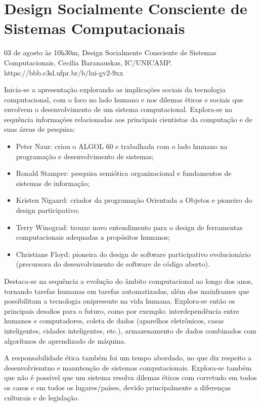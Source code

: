 \section{Design Socialmente Consciente de Sistemas Computacionais}

\begin{center}
  \vspace{1cm}
  03 de agosto às 10h30m, Design Socialmente Consciente de Sistemas Computacionais, Cecilia Baranauskas, IC/UNICAMP. https://bbb.c3sl.ufpr.br/b/lui-gv2-9xx
  \vspace{1cm}
\end{center}

Inicia-se a apresentação explorando as implicações sociais da tecnologia computacional, com o foco no lado humano e nos dilemas éticos e sociais que envolvem o desenvolvimento de um sistema computacional. Explora-se na sequência informações relacionadas aos principais cientistas da computação e de suas áreas de pesquisa:

\begin{itemize}
  \item Peter Naur: criou o ALGOL 60 e trabalhada com o lado humano na programação e desenvolvimento de sistemas;
  \item Ronald Stamper: pesquisa semiótica organizacional e fundamentos de sistemas de informação;
  \item Kristen Nigaard: criador da programação Orientada a Objetos e pioneiro do design participativo;
  \item Terry Winograd: trouxe novo entendimento para o design de ferramentas computacionais adequadas a propósitos humanos;
  \item Christiane Floyd: pioneira do design de software participativo evolucionário (precursora do desenvolvimento de software de código aberto).
\end{itemize}

Destaca-se na sequência a evolução do âmbito computacional ao longo dos anos, tornando tarefas humanas em tarefas automatizadas, além dos mainframes que possibilitam a tecnologia onipresente na vida humana. Explora-se então os principais desafios para o futuro, como por exemplo: interdependência entre humanos e computadores, coleta de dados (aparelhos eletrônicos, casas inteligentes, cidades inteligentes, etc.), armazenamento de dados combinados com algorítmos de aprendizado de máquina.

A responsabilidade ética também foi um tempo abordado, no que diz respeito a desenvolviemtno e manutenção de sistemas computacionais. Explora-se também que não é possível que um sistema resolva dilemas éticos com corretudo em todos os casos e em todos os lugares/países, devido principalmente a diferenças culturais e de legislação.

